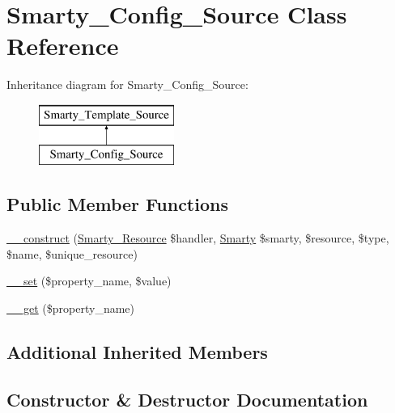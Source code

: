 \hypertarget{class_smarty___config___source}{}\section{Smarty\+\_\+\+Config\+\_\+\+Source Class Reference}
\label{class_smarty___config___source}
Inheritance diagram for Smarty\+\_\+\+Config\+\_\+\+Source\+:\begin{figure}[H]
\begin{center}
\leavevmode
\includegraphics[height=2.000000cm]{class_smarty___config___source}
\end{center}
\end{figure}
\subsection*{Public Member Functions}
\begin{DoxyCompactItemize}
\item 
\hyperlink{class_smarty___config___source_a1b175af6efed8fa7081e2c8cebe4a13d}{\+\_\+\+\_\+construct} (\hyperlink{class_smarty___resource}{Smarty\+\_\+\+Resource} \$handler, \hyperlink{class_smarty}{Smarty} \$smarty, \$resource, \$type, \$name, \$unique\+\_\+resource)
\item 
\hyperlink{class_smarty___config___source_a3a449beac9d0c7fdd8325b61b21f52a0}{\+\_\+\+\_\+set} (\$property\+\_\+name, \$value)
\item 
\hyperlink{class_smarty___config___source_a51458d48bdbac63ccde60e4ae3357388}{\+\_\+\+\_\+get} (\$property\+\_\+name)
\end{DoxyCompactItemize}
\subsection*{Additional Inherited Members}


\subsection{Constructor \& Destructor Documentation}
\hypertarget{class_smarty___config___source_a1b175af6efed8fa7081e2c8cebe4a13d}{}
